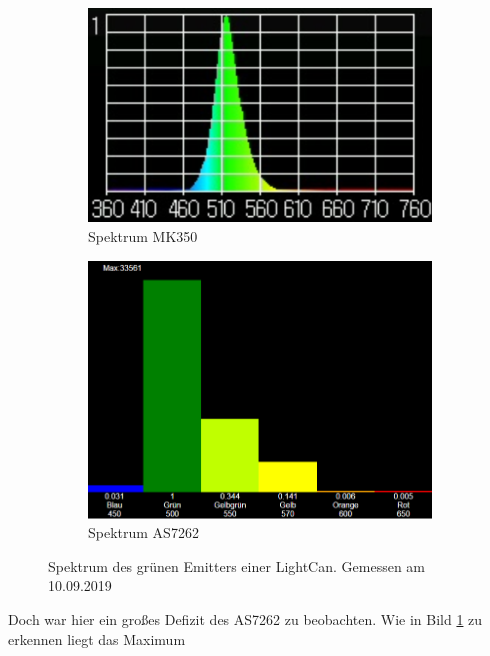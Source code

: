 \documentclass[11pt]{scrartcl}
\begin{document}
\begin{figure}[H]
    \centering
    \begin{subfigure}[b]{0.49\textwidth}
        \includegraphics[width=\textwidth]{images/mk350_lightcan_green_spectrum.png}
        \caption{Spektrum MK350}\label{fig:green_spec_MK350}
    \end{subfigure}
    \hfill 
    \begin{subfigure}[b]{0.49\textwidth}
        \includegraphics[width=\textwidth]{images/app_lightcan_green_spectrum.png}
        \caption{Spektrum AS7262}\label{fig:green_spec_7262}
    \end{subfigure}
    \caption{Spektrum des grünen Emitters einer LightCan. Gemessen am 10.09.2019}
\end{figure}
\noindent
Doch war hier ein großes Defizit des AS7262 zu beobachten. Wie in Bild  \ref{fig:green_spec_MK350} zu erkennen liegt das Maximum
\end{document}
